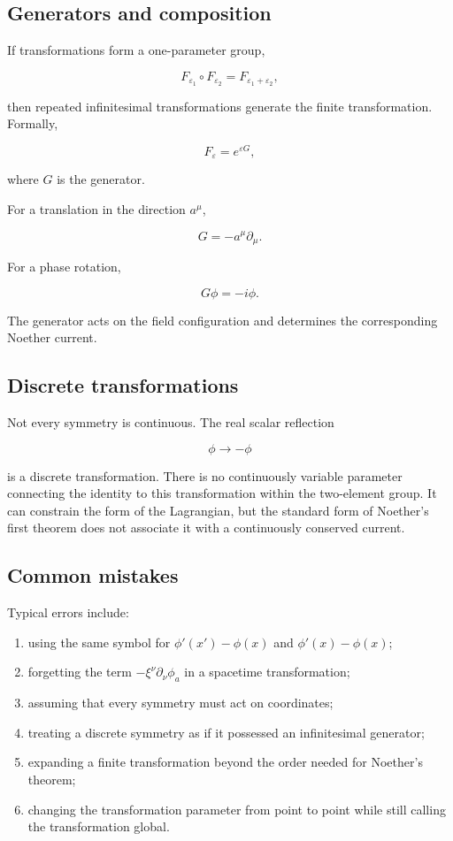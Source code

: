 \subsection{Generators and composition}

If transformations form a one-parameter group,

\[
F_{\varepsilon_1}
\circ
F_{\varepsilon_2}
=
F_{\varepsilon_1+\varepsilon_2},
\]

then repeated infinitesimal transformations generate the finite transformation. Formally,

\[
F_{\varepsilon}
=
e^{\varepsilon G},
\]

where \(G\) is the generator.

For a translation in the direction \(a^{\mu}\),

\[
G
=
-a^{\mu}\partial_{\mu}.
\]

For a phase rotation,

\[
G\phi
=
-i\phi.
\]

The generator acts on the field configuration and determines the corresponding Noether current.

\subsection{Discrete transformations}

Not every symmetry is continuous. The real scalar reflection

\[
\phi
\longrightarrow
-\phi
\]

is a discrete transformation. There is no continuously variable parameter connecting the identity to this transformation within the two-element group. It can constrain the form of the Lagrangian, but the standard form of Noether's first theorem does not associate it with a continuously conserved current.

\subsection{Common mistakes}

Typical errors include:

\begin{enumerate}
    \item using the same symbol for \(\phi'(x')-\phi(x)\) and \(\phi'(x)-\phi(x)\);
    \item forgetting the term \(-\xi^{\nu}\partial_{\nu}\phi_a\) in a spacetime transformation;
    \item assuming that every symmetry must act on coordinates;
    \item treating a discrete symmetry as if it possessed an infinitesimal generator;
    \item expanding a finite transformation beyond the order needed for Noether's theorem;
    \item changing the transformation parameter from point to point while still calling the transformation global.
\end{enumerate}

